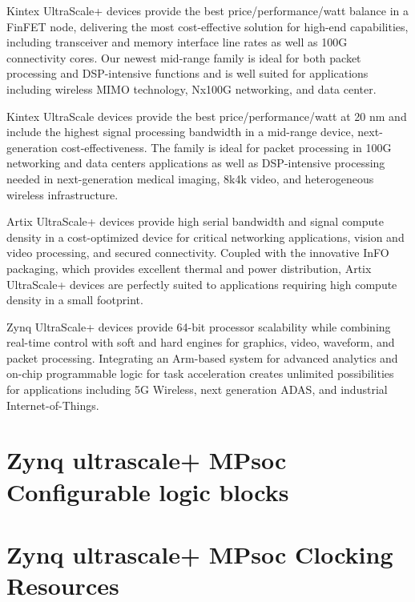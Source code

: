 \documentclass[12pt, a4paper]{report}
\begin{document}
    Kintex UltraScale+ devices provide the best price/performance/watt balance in a FinFET
    node, delivering the most cost-effective solution for high-end capabilities, including
    transceiver and memory interface line rates as well as 100G connectivity cores. Our newest
    mid-range family is ideal for both packet processing and DSP-intensive functions and is well
    suited for applications including wireless MIMO technology, Nx100G networking, and data
    center.


    Kintex UltraScale devices provide the best price/performance/watt at 20 nm and include
    the highest signal processing bandwidth in a mid-range device, next-generation cost-effectiveness. 
    The family is ideal for packet processing in 100G networking and data
    centers applications as well as DSP-intensive processing needed in next-generation medical
    imaging, 8k4k video, and heterogeneous wireless infrastructure.


    Artix UltraScale+ devices provide high serial bandwidth and signal compute density in a
    cost-optimized device for critical networking applications, vision and video processing, and
    secured connectivity. Coupled with the innovative InFO packaging, which provides excellent
    thermal and power distribution, Artix UltraScale+ devices are perfectly suited to
    applications requiring high compute density in a small footprint.


    Zynq UltraScale+ devices provide 64-bit processor scalability while combining real-time
    control with soft and hard engines for graphics, video, waveform, and packet processing.
    Integrating an Arm-based system for advanced analytics and on-chip programmable
    logic for task acceleration creates unlimited possibilities for applications including 5G
    Wireless, next generation ADAS, and industrial Internet-of-Things.


    \chapter{Zynq ultrascale+ MPsoc Configurable logic blocks}


    \chapter{Zynq ultrascale+ MPsoc Clocking Resources}

    
\end{document}
